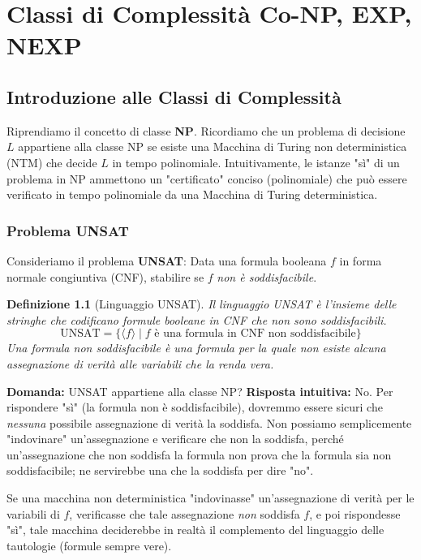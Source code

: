 \documentclass[a4paper, 11pt]{book} %
\newtheorem{definition}[theorem]{Definizione}
\theoremstyle{definition}
\begin{document}
\chapter{Classi di Complessità Co-NP, EXP, NEXP}



\section{Introduzione alle Classi di Complessità}

Riprendiamo il concetto di classe \textbf{NP}. Ricordiamo che un problema di decisione $L$ appartiene alla classe NP se esiste una Macchina di Turing non deterministica (NTM) che decide $L$ in tempo polinomiale. Intuitivamente, le istanze "sì" di un problema in NP ammettono un "certificato" conciso (polinomiale) che può essere verificato in tempo polinomiale da una Macchina di Turing deterministica.

\subsection{Problema UNSAT}

Consideriamo il problema \textbf{UNSAT}:
Data una formula booleana $f$ in forma normale congiuntiva (CNF), stabilire se $f$ \textit{non è soddisfacibile}.

\begin{definition}[Linguaggio UNSAT]
Il linguaggio UNSAT è l'insieme delle stringhe che codificano formule booleane in CNF che non sono soddisfacibili.
\[
\text{UNSAT} = \{ \langle f \rangle \mid f \text{ è una formula in CNF non soddisfacibile} \}
\]
Una formula non soddisfacibile è una formula per la quale non esiste alcuna assegnazione di verità alle variabili che la renda vera.
\end{definition}

\textbf{Domanda:} UNSAT appartiene alla classe NP?
\textbf{Risposta intuitiva:} No. Per rispondere "sì" (la formula non è soddisfacibile), dovremmo essere sicuri che \textit{nessuna} possibile assegnazione di verità la soddisfa. Non possiamo semplicemente "indovinare" un'assegnazione e verificare che non la soddisfa, perché un'assegnazione che non soddisfa la formula non prova che la formula sia non soddisfacibile; ne servirebbe una che la soddisfa per dire "no".

Se una macchina non deterministica "indovinasse" un'assegnazione di verità per le variabili di $f$, verificasse che tale assegnazione \textit{non} soddisfa $f$, e poi rispondesse "sì", tale macchina deciderebbe in realtà il complemento del linguaggio delle tautologie (formule sempre vere).
\end{document}
